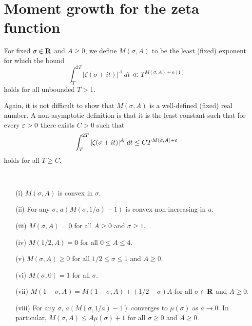 \chapter{Moment growth for the zeta function}

\begin{definition}\label{zeta-moment-def}  For fixed $\sigma \in \mathbf{R}$ and $A \geq 0$, we define $M(\sigma,A)$ to be the least (fixed) exponent for which the bound
$$ \int_T^{2T} |\zeta(\sigma+it)|^A\ dt \ll T^{M(\sigma,A)+o(1)}$$
holds for all unbounded $T > 1$.
\end{definition}

Again, it is not difficult to show that $M(\sigma,A)$ is a well-defined (fixed) real number.  A non-asymptotic definition is that it is the least constant such that for every $\varepsilon>0$ there exists $C>0$ such that
$$ \int_T^{2T} |\zeta(\sigma+it)|^A\ dt \leq C T^{M(\sigma,A)+\eps}$$
holds for all $T \geq C$.

\begin{lemma}\label{zeta-moment-basic}\
\begin{itemize}
\item[(i)] $M(\sigma,A)$ is convex in $\sigma$.
\item[(ii)] For any $\sigma$, $a (M(\sigma,1/a)-1)$ is convex non-increasing in $a$.
\item[(iii)] $M(\sigma,A)=0$ for all $A \geq 0$ and $\sigma \geq 1$.
\item[(iv)] $M(1/2,A)=0$ for all $0 \leq A \leq 4$.
\item[(v)] $M(\sigma,A) \geq 0$ for all $1/2 \leq \sigma \leq 1$ and $A \geq 0$.
\item[(vi)] $M(\sigma,0) = 1$ for all $\sigma$.
\item[(vii)] $M(1-\sigma,A) = M(1-\sigma,A) + (1/2-\sigma) A$ for all $\sigma \in \mathbf{R}$ and $A \geq 0$.
\item[(viii)] For any $\sigma$, $a(M(\sigma,1/a)-1)$ converges to $\mu(\sigma)$ as $a \to 0$.  In particular, $M(\sigma,A) \leq A \mu(\sigma) + 1$ for all $\sigma \geq 0$ and $A \geq 0$.
\end{itemize}
\end{lemma}

